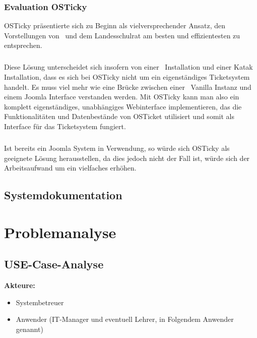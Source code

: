 \subsection{Evaluation OSTicky}
OSTicky präsentierte sich zu Beginn als vielversprechender Ansatz, den Vorstellungen von \getHammerl\ und dem Landesschulrat am besten und effizientesten zu entsprechen.
\paragraph{}
Diese Lösung unterscheidet sich insofern von einer \getOst\ Installation und einer Katak Installation, dass es sich bei OSTicky nicht um ein eigenständiges Ticketsystem handelt. Es muss viel mehr wie eine Brücke zwischen einer \getOst\ Vanilla Instanz und einem Joomla Interface verstanden werden. Mit OSTicky kann man also ein komplett eigenständiges, unabhängiges Webinterface implementieren, das die Funktionalitäten und Datenbestände von OSTicket utilisiert und somit als Interface für das Ticketsystem fungiert.
\paragraph{}
Ist bereits ein Joomla System in Verwendung, so würde sich OSTicky als geeignete Lösung herausstellen, da dies jedoch nicht der Fall ist, würde sich der Arbeitsaufwand um ein vielfaches erhöhen.



\newpage
\section{Systemdokumentation}







\chapter{Problemanalyse}

\section{USE-Case-Analyse}
{\linespread{.5}
	\textbf{Akteure:}
	\begin{itemize}
		\item Systembetreuer
		\item Anwender (IT-Manager und eventuell Lehrer, in Folgendem Anwender genannt)
\end{itemize}}

